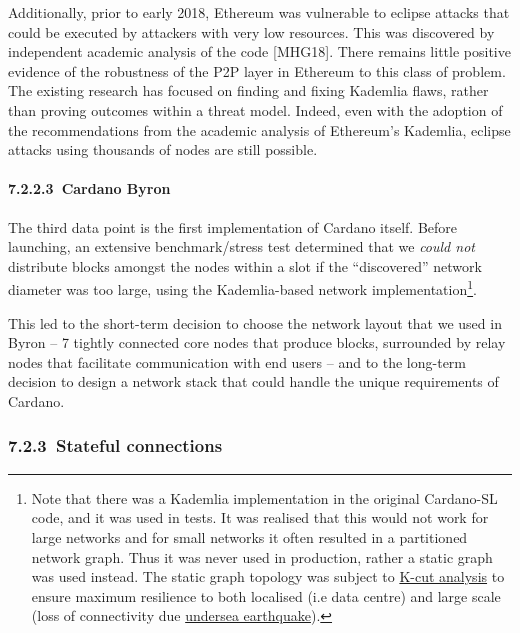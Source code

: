 \documentclass[11pt,a4paper]{article}
\begin{document}
Additionally, prior to early 2018, Ethereum was vulnerable to eclipse
attacks that could be executed by attackers with very low resources.
This was discovered by independent academic analysis of the code
{[}MHG18{]}. There remains little positive evidence of the robustness of
the P2P layer in Ethereum to this class of problem. The existing
research has focused on finding and fixing Kademlia flaws, rather than
proving outcomes within a threat model. Indeed, even with the adoption
of the recommendations from the academic analysis of Ethereum's
Kademlia, eclipse attacks using thousands of nodes are still possible.

\hypertarget{cardano-byron}{%
\paragraph{​7.2.2.3​~Cardano Byron}\label{cardano-byron}}

The third data point is the first implementation of Cardano itself.
Before launching, an extensive benchmark/stress test determined that we
\emph{could not} distribute blocks amongst the nodes within a slot if
the ``discovered'' network diameter was too large, using the
Kademlia-based network implementation\footnote{Note that there was a
  Kademlia implementation in the original Cardano-SL code, and it was
  used in tests. It was realised that this would not work for large
  networks and for small networks it often resulted in a partitioned
  network graph. Thus it was never used in production, rather a static
  graph was used instead. The static graph topology was subject to
  \href{https://en.wikipedia.org/wiki/Minimum_k-cut}{{K-cut analysis}}
  to ensure maximum resilience to both localised (i.e data centre) and
  large scale (loss of connectivity due
  \href{https://www.telecomramblings.com/2010/06/subsea-quakes-and-transatlantic-cable-diversity/}{{undersea
  earthquake}}).}.

This led to the short-term decision to choose the network layout that we
used in Byron -- 7 tightly connected core nodes that produce blocks,
surrounded by relay nodes that facilitate communication with end users
-- and to the long-term decision to design a network stack that could
handle the unique requirements of Cardano.

\hypertarget{stateful-connections}{%
\subsubsection{​7.2.3​~Stateful
connections}\label{stateful-connections}}
\end{document}
